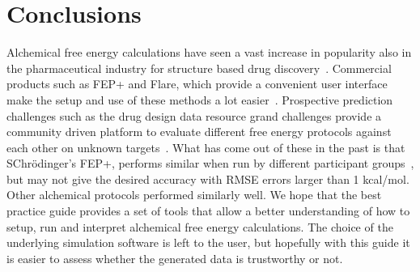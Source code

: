 \documentclass[9pt,bestpractices]{livecoms}
\begin{document}
\section{Conclusions}
\label{sec:conclusion}
Alchemical free energy calculations have seen a vast increase in popularity also in the pharmaceutical industry for structure based drug discovery~\cite{schindler2020largescale, sherborne2016collaborating, wagner2017computational}. Commercial products such as FEP+ and Flare, which provide a convenient user interface make the setup and use of these methods a lot easier~\cite{wang2015accurate}. Prospective prediction challenges such as the drug design data resource grand challenges provide a community driven platform to evaluate different free energy protocols against each other on unknown targets~\cite{gaieb2018d3r, gaieb2019d3r}. What has come out of these in the past is that SChrödinger's FEP+, performs similar when run by different participant groups~\cite{gaieb2018d3r}, but may not give the desired accuracy with RMSE errors larger than 1 kcal/mol. Other alchemical protocols performed similarly well. We hope that the best practice guide provides a set of tools that allow a better understanding of how to setup, run and interpret alchemical free energy calculations. The choice of the underlying simulation software is left to the user, but hopefully with this guide it is easier to assess whether the generated data is trustworthy or not. 
%
\end{document}
